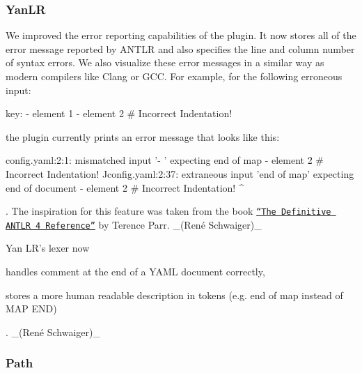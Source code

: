 \subsubsection*{Yan\+LR}


\begin{DoxyItemize}
\item We improved the error reporting capabilities of the plugin. It now stores all of the error message reported by A\+N\+T\+LR and also specifies the line and column number of syntax errors. We also visualize these error messages in a similar way as modern compilers like Clang or G\+CC. For example, for the following erroneous input\+:
\end{DoxyItemize}


\begin{DoxyCode}
key: - element 1
- element 2 # Incorrect Indentation!
\end{DoxyCode}


the plugin currently prints an error message that looks like this\+:


\begin{DoxyCode}
config.yaml:2:1: mismatched input '- ' expecting end of map
                 - element 2 # Incorrect Indentation!
                 ^^
config.yaml:2:37: extraneous input 'end of map' expecting end of document
                  - element 2 # Incorrect Indentation!
                                                      ^
\end{DoxyCode}


. The inspiration for this feature was taken from the book \href{https://pragprog.com/book/tpantlr2/the-definitive-antlr-4-reference}{\tt “\+The Definitive A\+N\+T\+LR 4 Reference”} by Terence Parr. \+\_\+(René Schwaiger)\+\_\+


\begin{DoxyItemize}
\item Yan L\+R’s lexer now
\begin{DoxyItemize}
\item handles comment at the end of a Y\+A\+ML document correctly,
\item stores a more human readable description in tokens (e.\+g. {\ttfamily end of map} instead of {\ttfamily M\+AP E\+ND})
\end{DoxyItemize}

. \+\_\+(René Schwaiger)\+\_\+
\end{DoxyItemize}

\subsubsection*{Path}

